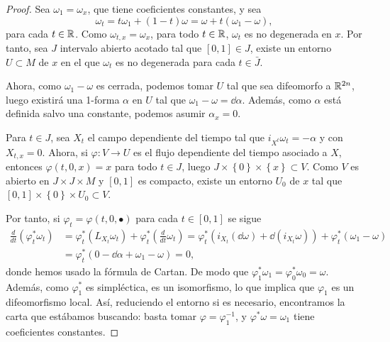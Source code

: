 \begin{proof}
  Sea $\omega_1=\omega_x$, que tiene coeficientes constantes, y sea
  \begin{equation*}
    \omega_t=t\omega_1 + (1-t) \omega = \omega + t(\omega_1-\omega),
  \end{equation*}
  para cada $t\in \mathbb{R}$. Como $\omega_{t,x}=\omega_x$, para todo $t \in \mathbb{R}$, $\omega_t$ es no degenerada en $x$. Por tanto, sea $J$ intervalo abierto acotado tal que $[0,1]\in J$, existe un entorno $U \subset M$ de $x$ en el que $\omega_t$ es no degenerada para cada $t\in \bar{J}$.

  Ahora, como $\omega_1-\omega$ es cerrada, podemos tomar $U$ tal que sea difeomorfo a $\mathbb{R}^{2n}$, luego existirá una 1-forma $\alpha$ en $U$ tal que $\omega_1-\omega=\dd \alpha$. Además, como $\alpha$ está definida salvo una constante, podemos asumir $\alpha_x=0$.

  Para $t \in J$, sea $X_t$ el campo dependiente del tiempo tal que $i_{X^t}\omega_t= - \alpha$ y con $X_{t,x}=0$. Ahora, si $\varphi:V\rightarrow U$ es el flujo dependiente del tiempo asociado a $X$, entonces $\varphi(t,0,x)=x$ para todo $t\in J$, luego $J\times \left\{ 0 \right\}\times \left\{ x \right\} \subset V$. Como $V$ es abierto en $J\times J\times M$ y $[0,1]$ es compacto, existe un entorno $U_0$ de $x$  tal que $[0,1]\times \left\{ 0 \right\}\times U_0 \subset V$. 
  
  Por tanto, si $\varphi_t = \varphi(t,0,\bullet)$ para cada $t\in [0,1]$ se sigue
  \begin{align*}
    \frac{d}{dt}(\varphi_t^*\omega_t) & = \varphi_t^* (L_{X_t}\omega_t) + \varphi_t^* \left( \frac{d}{dt}\omega_t \right) = \varphi_t^* (i_{X_t}(\dd \omega)+\dd (i_{X_t}\omega))+\varphi_t^*(\omega_1-\omega) \\
    & = \varphi_t^*(0-\dd \alpha + \omega_1 - \omega) = 0,
  \end{align*}
  donde hemos usado la fórmula de Cartan. De modo que $\varphi_1^*\omega_1=\varphi_0^*\omega_0=\omega$. Además, como $\varphi_1^*$ es simpléctica, es un isomorfismo, lo que implica que $\varphi_1$ es un difeomorfismo local. Así, reduciendo el entorno si es necesario, encontramos la carta que estábamos buscando: basta tomar $\varphi=\varphi_1^{-1}$, y $\varphi^*\omega=\omega_1$ tiene coeficientes constantes.
\end{proof}


